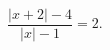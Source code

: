 \begin{ex}[type=equation]
	\begin{condition}
		$\dfrac{\big | x +2\big| - 4}{\big|x\big| - 1} = 2.$
	\end{condition}
\end{ex}